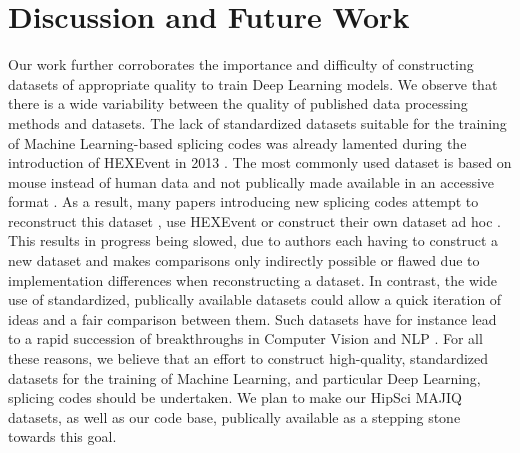\section*{Discussion and Future Work}
Our work further corroborates the importance and difficulty of constructing datasets of appropriate quality to train Deep Learning models. We observe that there is a wide variability between the quality of published data processing methods and datasets. The lack of standardized datasets suitable for the training of Machine Learning-based splicing codes was already lamented during the introduction of HEXEvent in 2013 \cite{hexevent}.
The most commonly used dataset is based on mouse instead of human data and not publically made available in an accessive format \cite{jha}. As a result, many papers introducing new splicing codes attempt to reconstruct this dataset \cite{d2vsplicing}, use HEXEvent \cite{dsc} or construct their own dataset ad hoc \cite{cossmo}. This results in progress being slowed, due to authors each having to construct a new dataset and makes comparisons only indirectly possible or flawed due to implementation differences when reconstructing a dataset. %
In contrast, the wide use of standardized, publically available datasets could allow a quick iteration of ideas and a fair comparison between them. Such datasets have for instance lead to a rapid succession of breakthroughs in Computer Vision and NLP \cite{deeplearning}.
For all these reasons, we believe that an effort to construct high-quality, standardized datasets for the training of Machine Learning, and particular Deep Learning, splicing codes should be undertaken. We plan to make our HipSci MAJIQ datasets, as well as our code base, publically available as a stepping stone towards this goal.




